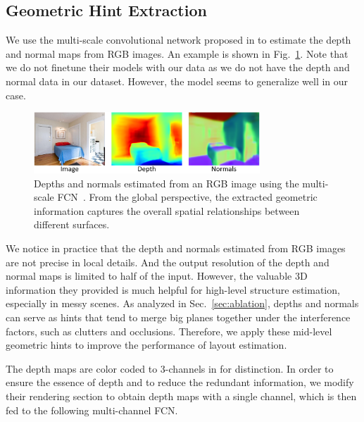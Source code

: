 \subsection{Geometric Hint Extraction}
\label{sec:depth_normal}

We use the multi-scale convolutional network proposed in \cite{eigen2015predicting} to estimate the depth and normal maps from RGB images.
An example is shown in Fig.~\ref{fig:depthandnormal}. 
Note that we do not finetune their models with our data as we do not have the depth and normal data in our dataset.
However, the model seems to generalize well in our case. 
%

\begin{figure}
	\centering
	\includegraphics[width=8.5cm]{figure/DN.png}
	\caption{Depths and normals estimated from an RGB image using the multi-scale FCN~\cite{eigen2015predicting}. From the global perspective, the extracted geometric information captures the overall spatial relationships between different surfaces. }
	\label{fig:depthandnormal}
\end{figure}

We notice in practice that the depth and normals estimated from RGB images are not precise in local details. And the output resolution of the depth and normal maps is limited to half of the input. However, the valuable 3D information they provided is much helpful for high-level structure estimation, especially in messy scenes.  
%
As analyzed in Sec.~\ref{sec:ablation}, depths and normals can serve as hints that tend to merge big planes together under the interference factors, such as clutters and occlusions. 
%
Therefore, we apply these mid-level geometric hints to improve the performance of layout estimation. 
%


The depth maps are color coded to 3-channels in \cite{eigen2015predicting} for distinction. In order to ensure the essence of depth and to reduce the redundant information, we modify their rendering section to obtain depth maps with a single channel, which is then fed to the following multi-channel FCN.

